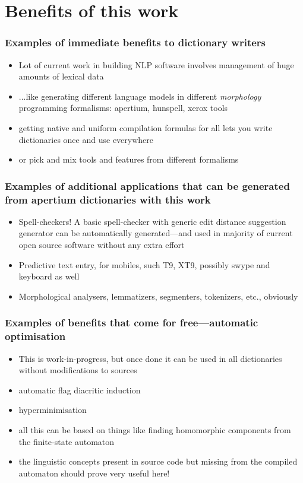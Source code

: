 \documentclass{beamer}
\begin{document}
\section{Benefits of this work}

\begin{frame}
    \frametitle{Examples of immediate benefits to dictionary writers}
    \begin{itemize}
        \item Lot of current work in building NLP software involves management
            of huge amounts of lexical data
        \item ...like generating different language models in different
            \emph{morphology} programming formalisms: apertium, hunspell,
            xerox tools
        \item getting native and uniform compilation formulas for all lets
            you \alert{write dictionaries once} and use everywhere
        \item or pick and mix tools and features from different formalisms
    \end{itemize}
\end{frame}

\begin{frame}
    \frametitle{Examples of additional applications that can be generated from
    apertium dictionaries with this work}
    \begin{itemize}
        \item Spell-checkers! A basic spell-checker with generic edit distance
            suggestion generator can be automatically generated---and used in
            majority of current open source software without any extra effort
        \item Predictive text entry, for mobiles, such T9, XT9, possibly swype
            and keyboard as well
        \item Morphological analysers, lemmatizers, segmenters, tokenizers,
            etc., obviously
    \end{itemize}
\end{frame}

\begin{frame}
    \frametitle{Examples of benefits that come for free---automatic optimisation}
    \begin{itemize}
        \item This is work-in-progress, but once done it can be used in all
            dictionaries without modifications to sources
        \item automatic flag diacritic induction
        \item hyperminimisation
        \item all this can be based on things like finding homomorphic
            components from the finite-state automaton
        \item the linguistic concepts present in source code but missing from
            the compiled automaton should prove very useful here!
    \end{itemize}
\end{frame}
\end{document}
